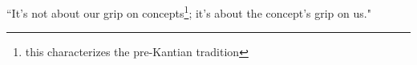 ``It's not about our grip on concepts\footnote{this characterizes the pre-Kantian tradition}; it's about the concept's grip on us."
